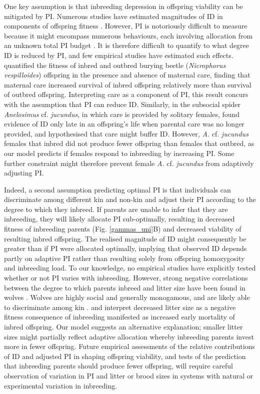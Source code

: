 \documentclass[12pt]{article}
\begin{document}
One key assumption is that inbreeding depression in offspring viability can be mitigated by PI. Numerous studies have estimated magnitudes of ID in components of offspring fitness \cite[][]{Keller2002, Charlesworth2009, Szulkin2012}. However, PI is notoriously difficult to measure because it might encompass numerous behaviours, each involving allocation from an unknown total PI budget \cite[][]{Parker2002}. It is therefore difficult to quantify to what degree ID is reduced by PI, and few empirical studies have estimated such effects. \cite{Pilakouta2015} quantified the fitness of inbred and outbred burying beetle (\textit{Nicrophorus vespilloides}) offspring in the presence and absence of maternal care, finding that maternal care increased survival of inbred offspring relatively more than survival of outbred offspring. Interpreting care as a component of PI, this result concurs with the assumption that PI can reduce ID. Similarly, in the subsocial spider \textit{Anelosimus} cf. \textit{jucundus}, in which care is provided by solitary females, \cite{Aviles2006} found evidence of ID only late in an offspring's life when parental care was no longer provided, and hypothesised that care might buffer ID. However, \textit{A.} cf. \textit{jucundus} females that inbred did not produce fewer offspring than females that outbred, as our model predicts if females respond to inbreeding by increasing PI. Some further constraint might therefore prevent female \textit{A.} cf. \textit{jucundus} from adaptively adjusting PI.

Indeed, a second assumption predicting optimal PI is that individuals can discriminate among different kin and non-kin and adjust their PI according to the degree to which they inbreed. If parents are unable to infer that they are inbreeding, they will likely allocate PI sub-optimally, resulting in decreased fitness of inbreeding parents (Fig. \ref{gammas_uni}B) and decreased viability of resulting inbred offspring. The realised magnitude of ID might consequently be greater than if PI were allocated optimally, implying that observed ID depends partly on adaptive PI rather than resulting solely from offspring homozygosity and inbreeding load. To our knowledge, no empirical studies have explicitly tested whether or not PI varies with inbreeding. However, strong negative correlations between the degree to which parents inbreed and litter size have been found in wolves \cite[\textit{Canis lupus};][]{Liberg2005, Fredrickson2007}. Wolves are highly social and generally monogamous, and are likely able to discriminate among kin \cite[][]{Raikkonen2009, Geffen2011}. \cite{Liberg2005} and \cite{Fredrickson2007} interpret decreased litter size as a negative fitness consequence of inbreeding manifested as increased early mortality of inbred offspring. Our model suggests an alternative explanation; smaller litter sizes might partially reflect adaptive allocation whereby inbreeding parents invest more in fewer offspring. Future empirical assessments of the relative contributions of ID and adjusted PI in shaping offspring viability, and tests of the prediction that inbreeding parents should produce fewer offspring, will require careful observation of variation in PI and litter or brood sizes in systems with natural or experimental variation in inbreeding.
\end{document}
